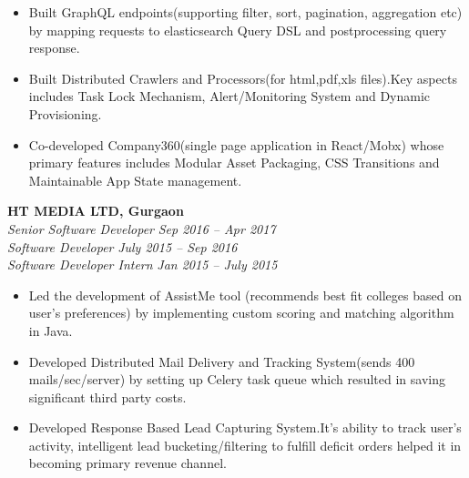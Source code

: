 \documentclass[margin,line]{resume}
\begin{document}
\begin{resume}
\begin{itemize}
            \item Built GraphQL endpoints(supporting filter, sort, pagination, aggregation etc) by mapping requests to elasticsearch Query DSL and postprocessing query response.
            \item Built Distributed Crawlers and Processors(for html,pdf,xls files).Key aspects includes Task Lock Mechanism, Alert/Monitoring System and Dynamic Provisioning.
           \item Co-developed Company360(single page application in React/Mobx) whose primary features includes Modular Asset Packaging, CSS Transitions and Maintainable App State management.
        \end{itemize}

    \textbf{HT MEDIA LTD, Gurgaon}\\
           \textsl{Senior Software Developer} \hfill \textsl{Sep 2016 -- Apr 2017} \vspace{0mm}\\\vspace{0mm}%
           \textsl{Software Developer} \hfill \textsl{July 2015 -- Sep 2016} \vspace{0mm}\\\vspace{0mm}%
           \textsl{Software Developer Intern} \hfill \textsl{Jan 2015 -- July 2015} \vspace{0mm}\\\vspace{0mm}%
    \begin{itemize}

			\item Led the development of AssistMe tool (recommends best fit colleges based on user's preferences) by implementing custom scoring and matching algorithm in Java.
            \item Developed Distributed Mail Delivery and Tracking System(sends 400 mails/sec/server) by setting up Celery task queue which resulted in saving significant third party costs.
            \item Developed Response Based Lead Capturing System.It's ability to track user's activity, intelligent lead bucketing/filtering to fulfill deficit orders helped it in becoming primary revenue channel.


\end{itemize}
\end{resume}
\end{document}
